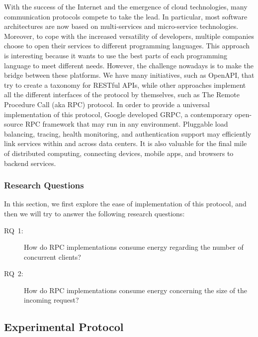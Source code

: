 
With the success of the Internet and the emergence of cloud technologies, many communication protocols compete to take the lead.
In particular, most software architectures are now based on multi-services and micro-service technologies.
Moreover, to cope with the increased versatility of developers, multiple companies choose to open their services to different programming languages.
This approach is interesting because it wants to use the best parts of each programming language to meet different needs.
However, the challenge nowadays is to make the bridge between these platforms.
We have many initiatives, such as OpenAPI, that try to create a taxonomy for RESTful APIs, while other approaches implement all the different interfaces of the protocol by themselves, such as The Remote Procedure Call (aka RPC) protocol.
In order to provide a universal implementation of this protocol, Google developed GRPC, a contemporary open-source RPC framework that may run in any environment. Pluggable load balancing, tracing, health monitoring, and authentication support may efficiently link services within and across data centers. It is also valuable for the final mile of distributed computing, connecting devices, mobile apps, and browsers to backend services.

\subsubsection{Research Questions}
In this section, we first explore the ease of implementation of this protocol, and then we will try to answer the following research questions:
\begin{description}
    \item[\textsc{RQ}~1:] How do RPC implementations consume energy regarding the number of concurrent clients?
    \item[\textsc{RQ}~2:] How do RPC implementations consume energy concerning the size of the incoming request?
\end{description}

\subsection{Experimental Protocol}

